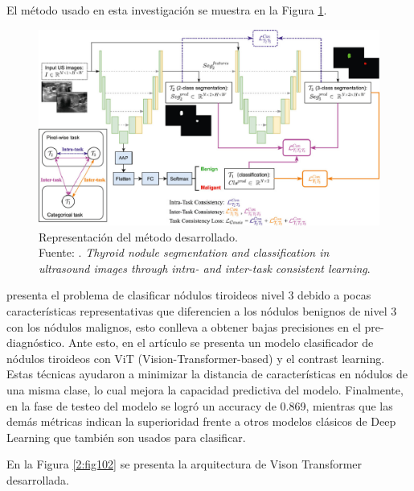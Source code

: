 El método usado en esta investigación se muestra en la Figura \ref{2:fig101}.

\begin{figure}[H]
	\begin{center}
		\includegraphics[width=1.00\textwidth]{2/figures/antecedente_4.jpg}
		\caption[Representación del método desarrollado]{Representación del método desarrollado. \\
		Fuente: \cite{pr_kang2022thysegclass}. \textit{Thyroid nodule segmentation and classification in ultrasound images through intra- and inter-task consistent learning}.}
		\label{2:fig101}
	\end{center}
\end{figure}


\cite{pr_sun2023classthynvit} presenta el problema de clasificar nódulos tiroideos nivel 3 debido a pocas características representativas que diferencien a los nódulos benignos de nivel 3 con los nódulos malignos, esto conlleva a obtener bajas precisiones en el pre-diagnóstico. Ante esto, en el artículo se presenta un modelo clasificador de nódulos tiroideos con ViT (Vision-Transformer-based) y el contrast learning. Estas técnicas ayudaron a minimizar la distancia de características en nódulos de una misma clase, lo cual mejora la capacidad predictiva del modelo. Finalmente, en la fase de testeo del modelo se logró un accuracy de 0.869, mientras que las demás métricas indican la superioridad frente a otros modelos clásicos de Deep Learning que también son usados para clasificar.

En la Figura \ref{2:fig102} se presenta la arquitectura de Vison Transformer desarrollada.

